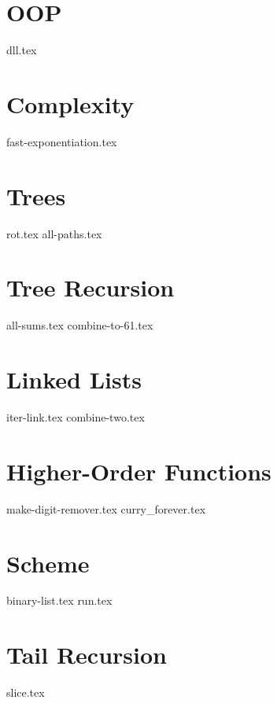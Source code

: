 \documentclass{exam}
\begin{document}
\section{OOP}
\begin{questions}
{dll.tex}
\end{questions}
\newpage

\section{Complexity}
\begin{questions}
{fast-exponentiation.tex}
\end{questions}

\section{Trees}
\begin{questions}
{rot.tex}
{all-paths.tex}
\end{questions}

\section{Tree Recursion}
\begin{questions}
{all-sums.tex}
{combine-to-61.tex}
\end{questions}

\section{Linked Lists}
\begin{questions}
{iter-link.tex}
{combine-two.tex}
\end{questions}

\section{Higher-Order Functions}
\begin{questions}
{make-digit-remover.tex}
{curry_forever.tex}
\end{questions}

\section{Scheme}
\begin{questions}
{binary-list.tex}
{run.tex}
\end{questions}

\section{Tail Recursion}
\begin{questions}
{slice.tex}
\end{questions}
\end{document}
